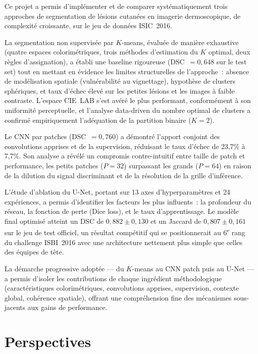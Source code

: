 \documentclass[12pt,a4paper]{article}
\begin{document}
Ce projet a permis d'implémenter et de comparer systématiquement trois approches de segmentation de lésions cutanées en imagerie dermoscopique, de complexité croissante, sur le jeu de données ISIC~2016.

La segmentation non supervisée par $K$-means, évaluée de manière exhaustive (quatre espaces colorimétriques, trois méthodes d'estimation du $K$ optimal, deux règles d'assignation), a établi une baseline rigoureuse (DSC~$= 0{,}648$ sur le test set) tout en mettant en évidence les limites structurelles de l'approche~: absence de modélisation spatiale (vulnérabilité au vignettage), hypothèse de clusters sphériques, et taux d'échec élevé sur les petites lésions et les images à faible contraste. L'espace CIE~LAB s'est avéré le plus performant, conformément à son uniformité perceptuelle, et l'analyse data-driven du nombre optimal de clusters a confirmé empiriquement l'adéquation de la partition binaire ($K = 2$).

Le CNN par patches (DSC~$= 0{,}760$) a démontré l'apport conjoint des convolutions apprises et de la supervision, réduisant le taux d'échec de 23{,}7\% à 7{,}7\%. Son analyse a révélé un compromis contre-intuitif entre taille de patch et performance, les petits patches ($P = 32$) surpassant les grands ($P = 64$) en raison de la dilution du signal discriminant et de la résolution de la grille d'inférence.

L'étude d'ablation du U-Net, portant sur 13 axes d'hyperparamètres et 24 expériences, a permis d'identifier les facteurs les plus influents~: la profondeur du réseau, la fonction de perte (Dice loss), et le taux d'apprentissage. Le modèle final optimisé atteint un DSC de $0{,}882 \pm 0{,}130$ et un Jaccard de $0{,}807 \pm 0{,}161$ sur le jeu de test officiel, un résultat compétitif qui se positionnerait au 6\textsuperscript{e} rang du challenge ISBI~2016 avec une architecture nettement plus simple que celles des équipes de tête.

La démarche progressive adoptée --- du $K$-means au CNN patch puis au U-Net --- a permis d'isoler les contributions de chaque ingrédient méthodologique (caractéristiques colorimétriques, convolutions apprises, supervision, contexte global, cohérence spatiale), offrant une compréhension fine des mécanismes sous-jacents aux gains de performance.


\section{Perspectives}
\label{sec:perspectives}
\end{document}
